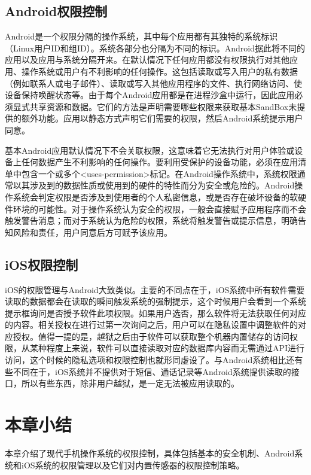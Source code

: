 		\subsection{Android权限控制}
			
			Android是一个权限分隔的操作系统，其中每个应用都有其独特的系统标识（Linux用户ID和组ID）。系统各部分也分隔为不同的标识。Android据此将不同的应用以及应用与系统分隔开来。在默认情况下任何应用都没有权限执行对其他应用、操作系统或用户有不利影响的任何操作。这包括读取或写入用户的私有数据（例如联系人或电子邮件）、读取或写入其他应用程序的文件、执行网络访问、使设备保持唤醒状态等。由于每个Android应用都是在进程沙盒中运行，因此应用必须显式共享资源和数据。它们的方法是声明需要哪些权限来获取基本SandBox未提供的额外功能。应用以静态方式声明它们需要的权限，然后Android系统提示用户同意。
			
			基本Android应用默认情况下不会关联权限，这意味着它无法执行对用户体验或设备上任何数据产生不利影响的任何操作。要利用受保护的设备功能，必须在应用清单中包含一个或多个<uses-permission>标记。在Android操作系统中，系统权限通常以其涉及到的数据性质或使用到的硬件的特性而分为安全或危险的。Android操作系统会判定权限是否涉及到使用者的个人私密信息，或是否存在破坏设备的软硬件环境的可能性。对于操作系统认为安全的权限，一般会直接赋予应用程序而不会触发警告消息；而对于系统认为危险的权限，系统将触发警告或提示信息，明确告知风险和责任，用户同意后方可赋予该应用。
		
		\subsection{iOS权限控制}
			
			iOS的权限管理与Android大致类似。主要的不同点在于，iOS系统中所有软件需要读取的数据都会在读取的瞬间触发系统的强制提示，这个时候用户会看到一个系统提示框询问是否授予软件此项权限。如果用户选否，那么软件将无法获取任何对应的内容。相关授权在进行过第一次询问之后，用户可以在隐私设置中调整软件的对应授权。值得一提的是，越狱之后由于软件可以获取整个机器内置储存的访问权限，从某种程度上来说，软件可以直接读取对应的数据库内容而无需通过API进行访问，这个时候的隐私选项和权限控制也就形同虚设了。与Android系统相比还有些不同在于，iOS系统并不提供对于短信、通话记录等Android系统提供读取的接口，所以有些东西，除非用户越狱，是一定无法被应用读取的。

			
	\section{本章小结}
		本章介绍了现代手机操作系统的权限控制，具体包括基本的安全机制、Android系统和iOS系统的权限管理以及它们对内置传感器的权限控制策略。